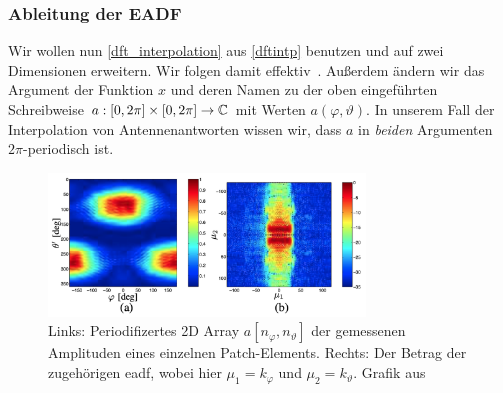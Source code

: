 %
%
%
%
\subsubsection{Ableitung der EADF}
%
%
Wir wollen nun \eqref{dft_interpolation} aus \cref{dftintp} benutzen und auf zwei Dimensionen erweitern. Wir folgen damit effektiv~\cite{landmann2004EADF}.
Au{\ss}erdem \"andern wir das Argument der Funktion $x$ und deren Namen zu der oben eingef\"uhrten Schreibweise $a : [0, 2 \pi] \times [0, 2 \pi] \rightarrow \mathbb{C}$ mit Werten $a(\varphi, \vartheta)$. 
In unserem Fall der Interpolation von Antennenantworten wissen wir, dass $a$ in \emph{beiden} Argumenten $2\pi$-periodisch ist.

\begin{figure}[t]
    \centering\includegraphics[width=0.75\textwidth]{img/eadf/bp_aperture.png}
    \caption{Links: Periodifizertes 2D Array $a[n_\varphi, n_\vartheta]$ der gemessenen Amplituden eines einzelnen Patch-Elements. Rechts: Der Betrag der zugeh\"origen \gls{eadf}, wobei hier $\mu_1 = k_\varphi$ und $\mu_2 = k_\vartheta$. Grafik aus~\cite{landmann2004EADF}}\label{eadf_bp_aperture}
\end{figure}

